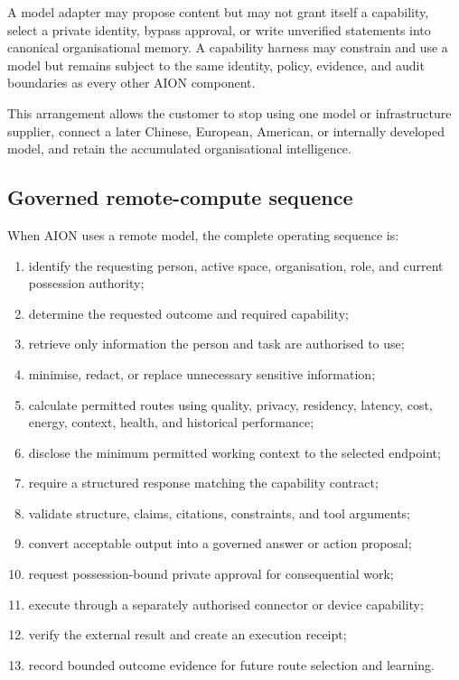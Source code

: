 A model adapter may propose content but may not grant itself a capability,
select a private identity, bypass approval, or write unverified statements into
canonical organisational memory.  A capability harness may constrain and use a
model but remains subject to the same identity, policy, evidence, and audit
boundaries as every other AION component.

This arrangement allows the customer to stop using one model or infrastructure
supplier, connect a later Chinese, European, American, or internally developed
model, and retain the accumulated organisational intelligence.

\subsection{Governed remote-compute sequence}

When AION uses a remote model, the complete operating sequence is:

\begin{enumerate}
  \item identify the requesting person, active space, organisation, role, and
        current possession authority;
  \item determine the requested outcome and required capability;
  \item retrieve only information the person and task are authorised to use;
  \item minimise, redact, or replace unnecessary sensitive information;
  \item calculate permitted routes using quality, privacy, residency, latency,
        cost, energy, context, health, and historical performance;
  \item disclose the minimum permitted working context to the selected endpoint;
  \item require a structured response matching the capability contract;
  \item validate structure, claims, citations, constraints, and tool arguments;
  \item convert acceptable output into a governed answer or action proposal;
  \item request possession-bound private approval for consequential work;
  \item execute through a separately authorised connector or device capability;
  \item verify the external result and create an execution receipt;
  \item record bounded outcome evidence for future route selection and learning.
\end{enumerate}

